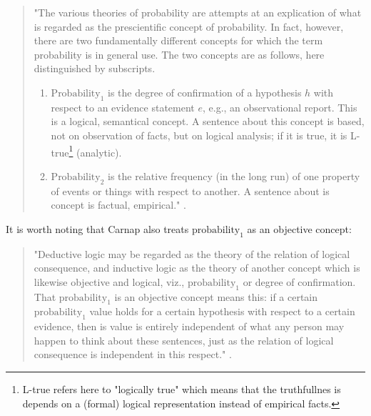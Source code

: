 \documentclass[
]{report}
\theoremstyle{definition}
\theoremstyle{definition}
\begin{document}
\begin{quote}
"The various theories of probability are attempts at an explication of what is regarded as the prescientific concept of probability. In fact, however, there are two fundamentally different concepts for which the term probability is in general use. The two concepts are as follows, here distinguished by subscripts.
\begin{enumerate}[label=(\arabic*)]
  \item $\text{Probability}_1$ is the degree of confirmation of a hypothesis $h$ with respect to an evidence statement $e$, e.g., an observational report. This is a logical, semantical concept. A sentence about this concept is based, not on observation of facts, but on logical analysis; if it is true, it is L-true\footnote{L-true refers here to "logically true" which means that the truthfullnes is depends on a (formal) logical representation instead of empirical facts.} (analytic).
  \item $\text{Probability}_2$ is the relative frequency (in the long run) of one property of events or things with respect to another. A sentence about is concept is factual, empirical." \cite[p.19]{carnap_logical_1950}.
\end{enumerate}
\end{quote}

It is worth noting that Carnap also treats \(\text{probability}_1\) as
an objective concept:

\begin{quote}
"Deductive logic may be regarded as the theory of the relation of logical consequence, and inductive logic as the theory of another concept which is likewise objective and logical, viz., $\text{probability}_1$ or degree of confirmation. That $\text{probability}_1$ is an objective concept means this: if a certain $\text{probability}_1$ value holds for a certain hypothesis with respect to a certain evidence, then is value is entirely independent of what any person may happen to think about these sentences, just as the relation of logical consequence is independent in this respect." \cite[p.43]{carnap_logical_1950}.
\end{quote}
\end{document}
